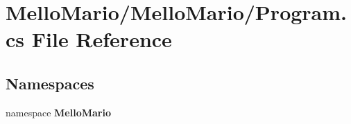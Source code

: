 \section{Mello\+Mario/\+Mello\+Mario/\+Program.cs File Reference}
\label{Program_8cs}
\subsection*{Namespaces}
\begin{DoxyCompactItemize}
\item 
namespace \textbf{ Mello\+Mario}
\end{DoxyCompactItemize}
